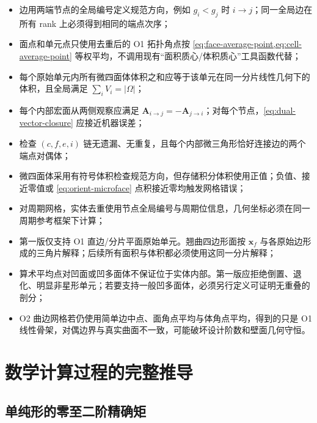 \documentclass[UTF8,a4paper,11pt,openany]{ctexrep}
\numberwithin{equation}{chapter}
\begin{document}
\begin{itemize}
  \item 边用两端节点的全局编号定义规范方向，例如 $g_i<g_j$ 时 $i\to j$；同一全局边在所有 rank 上必须得到相同的端点次序；
  \item 面点和单元点只使用去重后的 O1 拓扑角点按 \cref{eq:face-average-point,eq:cell-average-point} 等权平均，不调用现有“面积质心/体积质心”工具函数代替；
  \item 每个原始单元内所有微四面体体积之和应等于该单元在同一分片线性几何下的体积，且全局满足 $\sum_iV_i=|\Omega|$；
  \item 每个内部宏面从两侧观察应满足 $\bm A_{i\to j}=-\bm A_{j\to i}$；对每个节点，\cref{eq:dual-vector-closure} 应接近机器误差；
  \item 检查 $(c,f,e,i)$ 链无遗漏、无重复，且每个内部微三角形恰好连接边的两个端点对偶体；
  \item 微四面体采用有符号体积检查规范方向，但存储积分体积使用正值；负值、接近零值或 \cref{eq:orient-microface} 点积接近零均触发网格错误；
  \item 对周期网格，实体去重使用节点全局编号与周期位信息，几何坐标必须在同一周期参考框架下计算；
  \item 第一版仅支持 O1 直边/分片平面原始单元。翘曲四边形面按 $\bm x_f$ 与各原始边形成的三角片解释；后续所有面积与体积都必须使用这同一分片解释；
  \item 算术平均点对凹面或凹多面体不保证位于实体内部。第一版应拒绝倒置、退化、明显非星形单元；若要支持一般凹多面体，必须另行定义可证明无重叠的剖分；
  \item O2 曲边网格若仍使用简单边中点、面角点平均与体角点平均，得到的只是 O1 线性骨架，对偶边界与真实曲面不一致，可能破坏设计阶数和壁面几何守恒。
\end{itemize}

\chapter{数学计算过程的完整推导}

\section{单纯形的零至二阶精确矩}
\end{document}
